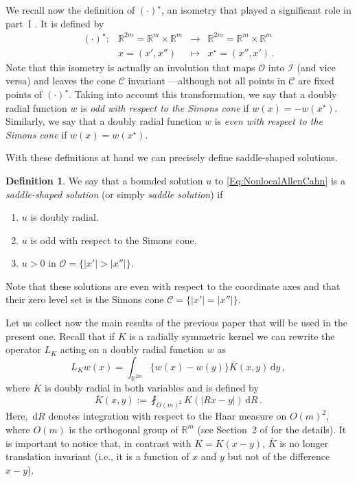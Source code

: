 \documentclass[12pt,reqno]{amsart}
\theoremstyle{definition}
\newtheorem{definition}[theorem]{Definition}
\theoremstyle{remark}
\newcommand{\con}[1]{\mathbb{#1}}
\newcommand{\R}{\con{R}} %
\newcommand{\ccal}{\mathscr{C}}
\newcommand{\ical}{\mathcal{I}}
\newcommand{\ocal}{\mathcal{O}}
\renewcommand{\d}{\,\mathrm{d}} %
\newcommand{\average}{\fint}
\numberwithin{equation}{section}
\begin{document}
We recall now the definition of $(\cdot)^\star$, an isometry that played a significant role in part~I \cite{FelipeSanz-Perela:IntegroDifferentialI}. It is defined by
\begin{equation*}
\label{Eq:DefStar}
\begin{matrix}
(\cdot)^\star \colon & \R^{2m}= \R^{m}\times \R^{m}  &\to&  \R^{2m}= \R^{m}\times \R^{m}  \\
& x = (x',x'') &\mapsto & x^\star = (x'',x')\,.
\end{matrix}
\end{equation*}
Note that this isometry is actually an involution that maps $\ocal$ into $\ical$ (and vice versa) and leaves the cone $\ccal$ invariant ---although not all points in $\ccal$ are fixed points of $(\cdot)^\star$. Taking into account this transformation, we say that a doubly radial function $w$ is \emph{odd with respect to the Simons cone} if $w(x) = -w(x^\star)$. Similarly, we say that a doubly radial function $w$ is \emph{even with respect to the Simons cone} if $w(x) = w(x^\star)$.



With these definitions at hand we can precisely define saddle-shaped solutions.
\begin{definition}
	\label{Def:SaddleShapedSol}
	We say that a bounded solution $u$ to \eqref{Eq:NonlocalAllenCahn} is a \emph{saddle-shaped solution} (or simply \emph{saddle solution}) if
	\begin{enumerate}
		\item $u$ is doubly radial.
		\item $u$ is odd with respect to the Simons cone.
		\item $u > 0$ in $\ocal = \{|x'| > |x''|\} $.
	\end{enumerate}
\end{definition}
Note that these solutions are even with respect to the coordinate axes and that their zero level set is the Simons cone $\mathscr{C} = \{|x'|=|x''|\}$. 



Let us collect now the main results of the previous paper \cite{FelipeSanz-Perela:IntegroDifferentialI} that will be used in the present one. Recall that if $K$ is a radially symmetric kernel we can rewrite the operator $L_K$ acting on a doubly radial function $w$ as
$$
L_K w(x) = \int_{\R^{2m}} \{w(x) - w(y)\} \overline{K}(x,y) \d y\,,
$$
where $\overline{K}$ is doubly radial in both variables and is defined by
\begin{equation}
\label{Eq:KbarDef}
\overline{K}(x,y) := \average_{O(m)^2} K(|Rx - y|)\d R\,.
\end{equation}
Here, $\d R$ denotes integration with respect to the Haar measure on $O(m)^2$, where $O(m)$ is the orthogonal group of $\R^m$ (see Section~2 of \cite{FelipeSanz-Perela:IntegroDifferentialI} for the details). It is important to notice that, in contrast with $K=K(x-y)$, $\overline{K}$ is no longer translation invariant (i.e., it is a function of $x$ and $y$ but not of the difference $x-y$).
\end{document}
